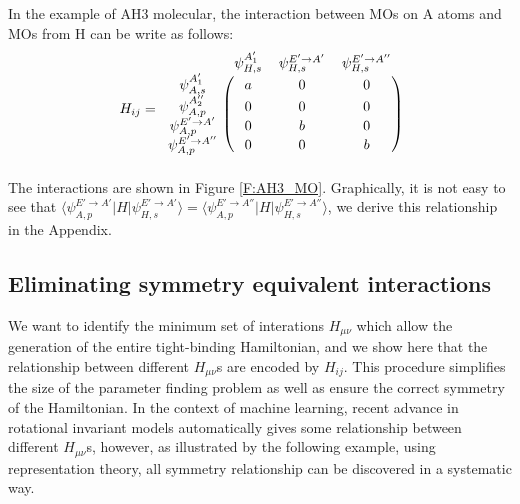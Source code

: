 \documentclass{article}
\begin{document}
In the example of AH3 molecular, the interaction between MOs on A atoms and MOs from H can be write as follows:
\begin{equation}
    H_{ij} = \begin{blockarray}{cccc}
        & \psi^{A_1'}_{H,s} & \psi^{E'\to A'}_{H,s} & \psi^{E'\to A''}_{H,s} \\
        \begin{block}{c(ccc)}
        \psi^{A_1'}_{A,s}      & a & 0 & 0 \\
        \psi^{A_2''}_{A,p}     & 0 & 0 & 0 \\
        \psi^{E'\to A'}_{A,p}  & 0 & b & 0 \\
        \psi^{E'\to A''}_{A,p} & 0 & 0 & b \\
        \end{block}
        \end{blockarray}
\end{equation}
The interactions are shown in Figure \ref{F:AH3_MO}. Graphically, it is not easy to see that 
$\langle \psi^{E'\to A'}_{A,p} | H | \psi^{E'\to A'}_{H,s} \rangle = \langle \psi^{E'\to A''}_{A,p} | H | \psi^{E'\to A''}_{H,s} \rangle$,
we derive this relationship in the Appendix.


\subsection{Eliminating symmetry equivalent interactions}
We want to identify the minimum set of interations $H_{\mu\nu}$ which allow the generation of the entire tight-binding Hamiltonian, and we show 
here that the relationship between different $H_{\mu\nu}$s are encoded by $H_{ij}$. This procedure simplifies the size of 
the parameter finding problem as well as ensure the correct symmetry of the Hamiltonian. In the context of machine learning, recent advance in 
rotational invariant models automatically gives some relationship between different $H_{\mu\nu}$s, however, as illustrated by 
the following example, using representation theory, all symmetry relationship can be discovered in a systematic way. 
\end{document}
